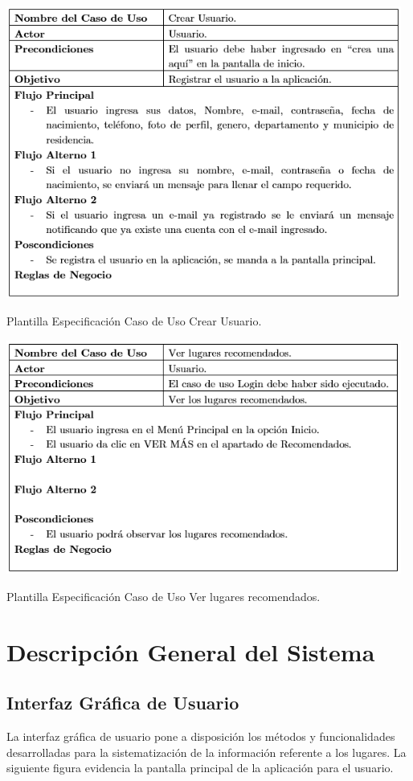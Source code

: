\documentclass[12pt,letterpaper,openany]{book}
\begin{document}
\begin{table}[H]
\centering
\includegraphics[width=13cm]{./imagenes/PCU/crear_usuario}
\caption{Plantilla Especificación Caso de Uso Crear Usuario.}
\end{table}

\begin{table}[H]
\centering
\includegraphics[width=13cm]{./imagenes/PCU/ver_lugares_recomendados}
\caption{Plantilla Especificación Caso de Uso Ver lugares recomendados.}
\end{table}

\section{Descripción General del Sistema}
\subsection{Interfaz Gráfica de Usuario}
La interfaz gráfica de usuario pone a disposición los métodos y funcionalidades desarrolladas para la sistematización de la información referente a los lugares. La siguiente figura evidencia la pantalla principal de la aplicación para el usuario.
\end{document}
